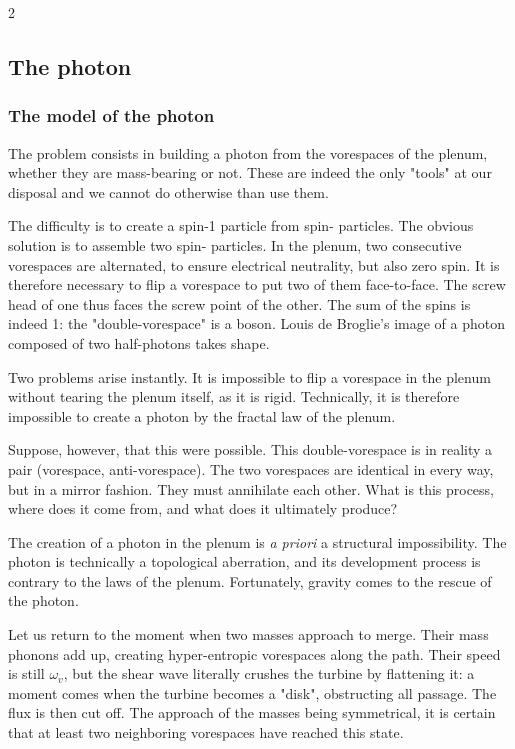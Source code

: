\begin{multicols}{2}
	\subsection{The photon}
	
	\subsubsection{The model of the photon}
	
	The problem consists in building a photon from the vorespaces of the plenum, 
	whether they are mass-bearing or not. These are indeed the only "tools" at our 
	disposal and we cannot do otherwise than use them.
	
	The difficulty is to create a spin-1 particle from spin- particles. 
	The obvious solution is to assemble two spin- particles. In the 
	plenum, two consecutive vorespaces are alternated, to ensure electrical 
	neutrality, but also zero spin. It is therefore necessary to flip a 
	vorespace to put two of them face-to-face. The screw head of one thus faces 
	the screw point of the other. The sum of the spins is indeed 1: the 
	"double-vorespace" is a boson. Louis de Broglie's image of a photon 
	composed of two half-photons takes shape. \cite{debroglie1934une}
	
	Two problems arise instantly. It is impossible to flip a vorespace in the 
	plenum without tearing the plenum itself, as it is rigid. Technically, it 
	is therefore impossible to create a photon by the fractal law of the 
	plenum.
	
	Suppose, however, that this were possible. This double-vorespace is in 
	reality a pair (vorespace, anti-vorespace). The two vorespaces are 
	identical in every way, but in a mirror fashion. They must annihilate 
	each other. What is this process, where does it come from, and what 
	does it ultimately produce?
	
	The creation of a photon in the plenum is \textit{a priori} a structural 
	impossibility. The photon is technically a topological aberration, and its 
	development process is contrary to the laws of the plenum. Fortunately, 
	gravity comes to the rescue of the photon.
	
	Let us return to the moment when two masses approach to merge. Their mass 
	phonons add up, creating hyper-entropic vorespaces along the path. Their 
	speed is still $\omega_v$, but the shear wave literally crushes the 
	turbine by flattening it: a moment comes when the turbine becomes a 
	"disk", obstructing all passage. The flux is then cut off. The approach 
	of the masses being symmetrical, it is certain that at least two 
	neighboring vorespaces have reached this state.
	

\end{multicols}
